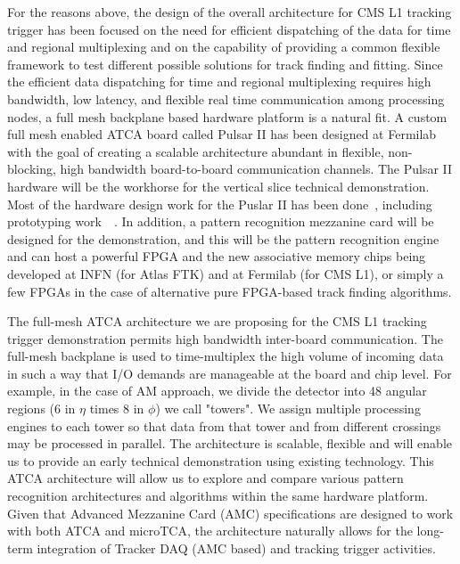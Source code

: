 	For the reasons above, the design of the overall architecture for CMS L1 tracking trigger has been focused on the need for efficient dispatching of the data for time and regional multiplexing and on the capability of providing a common flexible framework to test different possible solutions for track finding and fitting. Since the efficient data dispatching for time and regional multiplexing requires high bandwidth, low latency, and flexible real time communication among processing nodes, a full mesh backplane based hardware platform is a natural fit. A custom full mesh enabled ATCA board called Pulsar II has been designed at Fermilab with the goal of creating a scalable architecture abundant in flexible, non-blocking, high bandwidth board-to-board communication channels. The Pulsar II hardware will be the workhorse for the vertical slice technical demonstration. Most of the hardware design work for the Puslar II has been done~\cite{bib:PulsarII}, including prototyping work~\cite{bib:PulsarII-results}~\cite{bib:PulsarII-weblink}. In addition, a pattern recognition mezzanine card will be designed for the demonstration, and this will be the pattern recognition engine and can host a powerful FPGA and the new associative memory chips being developed at INFN (for Atlas FTK) and at Fermilab (for CMS L1), or simply a few FPGAs in the case of alternative pure FPGA-based track finding algorithms.  

	The full-mesh ATCA architecture we are proposing for the CMS L1 tracking trigger demonstration permits high bandwidth inter-board communication. The full-mesh backplane is used to time-multiplex the high volume of incoming data in such a way that I/O demands are manageable at the board and chip level. For example, in the case of AM approach, we divide the detector into 48 angular regions (6 in $\eta$ times 8 in $\phi$) we call "towers". We assign multiple processing engines to each tower so that data from that  tower and from different crossings may be processed in parallel. The architecture is scalable, flexible and will enable us to provide an early technical demonstration using existing technology. This ATCA architecture will allow us to explore and compare various pattern recognition architectures and algorithms within the same hardware platform. Given that Advanced Mezzanine Card (AMC) specifications are designed to work with both ATCA and microTCA, the architecture naturally allows for the long-term integration of Tracker DAQ (AMC based) and tracking trigger activities. 


